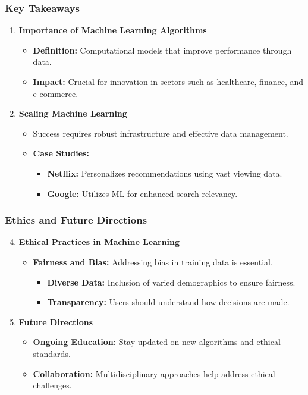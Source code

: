 \documentclass[aspectratio=169]{beamer}
\begin{document}
\begin{frame}[fragile]
    \frametitle{Key Takeaways}
    \begin{enumerate}
        \item \textbf{Importance of Machine Learning Algorithms}
        \begin{itemize}
            \item \textbf{Definition:} Computational models that improve performance through data.
            \item \textbf{Impact:} Crucial for innovation in sectors such as healthcare, finance, and e-commerce.
        \end{itemize}
        
        \item \textbf{Scaling Machine Learning}
        \begin{itemize}
            \item Success requires robust infrastructure and effective data management.
            \item \textbf{Case Studies:}
            \begin{itemize}
                \item \textbf{Netflix:} Personalizes recommendations using vast viewing data.
                \item \textbf{Google:} Utilizes ML for enhanced search relevancy.
            \end{itemize}
        \end{itemize}
    \end{enumerate}
\end{frame}

\begin{frame}[fragile]
    \frametitle{Ethics and Future Directions}
    \begin{enumerate}
        \setcounter{enumi}{3}
        \item \textbf{Ethical Practices in Machine Learning}
        \begin{itemize}
            \item \textbf{Fairness and Bias:} Addressing bias in training data is essential.
            \begin{itemize}
                \item \textbf{Diverse Data:} Inclusion of varied demographics to ensure fairness.
                \item \textbf{Transparency:} Users should understand how decisions are made.
            \end{itemize}
        \end{itemize}
        
        \item \textbf{Future Directions}
        \begin{itemize}
            \item \textbf{Ongoing Education:} Stay updated on new algorithms and ethical standards.
            \item \textbf{Collaboration:} Multidisciplinary approaches help address ethical challenges.
        \end{itemize}
    \end{enumerate}
\end{frame}
\end{document}
